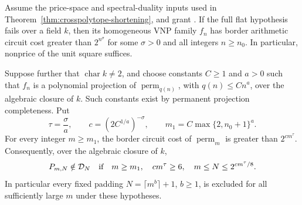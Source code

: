 \begin{corollary}
\label{cor:nonflat-stretched-gct}
Assume the price-space and spectral-duality inputs used in
Theorem~\ref{thm:crosspolytope-shortening}, and grant
\cite[Theorem~1.3]{OpenAI2026}.  If the full flat hypothesis
fails over a field $k$, then its homogeneous VNP family $f_n$
has border arithmetic circuit cost greater than $2^{n^\sigma}$
for some $\sigma>0$ and all integers $n\geq n_0$.
In particular, nonprice of the unit square suffices.

Suppose further that $\operatorname{char}k\ne2$, and choose
constants $C\geq1$ and $a>0$ such that $f_n$ is a polynomial
projection of $\operatorname{perm}_{q(n)}$, with
$q(n)\leq Cn^a$, over the algebraic closure of $k$.
Such constants exist by permanent projection completeness.
Put
\[
 \tau=\frac{\sigma}{a},\qquad
 c=(2C^{1/a})^{-\sigma},\qquad
 m_1=C\max\{2,n_0+1\}^{a}.
\]
For every integer $m\geq m_1$, the border circuit cost of
$\operatorname{perm}_m$ is greater than $2^{c m^\tau}$.
Consequently, over the algebraic closure of $k$,
\[
 P_{m,N}\notin\mathcal D_N
 \quad\hbox{if}\quad
 m\geq m_1,\quad c m^\tau\geq6,\quad
 m\leq N\leq2^{c m^\tau/8}.
\]
In particular every fixed padding
$N=\lceil m^b\rceil+1$, $b\geq1$, is excluded for all
sufficiently large $m$ under these hypotheses.
\end{corollary}

